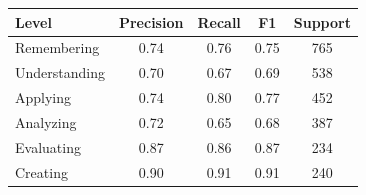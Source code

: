 \begin{tabular}{lcccc}
\hline
Level & Precision & Recall & F1 & Support \\
\hline
Remembering & 0.74 & 0.76 & 0.75 & 765 \\
Understanding & 0.70 & 0.67 & 0.69 & 538 \\
Applying & 0.74 & 0.80 & 0.77 & 452 \\
Analyzing & 0.72 & 0.65 & 0.68 & 387 \\
Evaluating & 0.87 & 0.86 & 0.87 & 234 \\
Creating & 0.90 & 0.91 & 0.91 & 240 \\
\hline
\end{tabular}